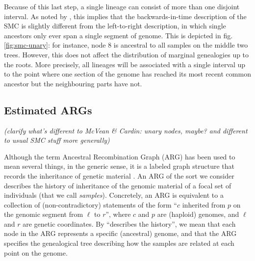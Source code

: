 \documentclass{article}
\newcommand{\comment}[1]{{\it \color{orange} (#1)}}
\begin{document}
Because of this last step, a single lineage can consist of more than one disjoint interval.
As noted by \cite{mcvean_approximating_2005},
this implies that the backwards-in-time description of the
SMC is slightly different from the left-to-right description,
in which single ancestors only ever span a single segment of genome.
This is depicted in fig.\ref{fig:smc-unary}:
for instance, node 8 is ancestral to all samples on the middle two trees.
However, this does not affect the distribution
of marginal genealogies up to the roots.
More precisely, all lineages will be associated with
a single interval up to the point where one section of the
genome has reached its most recent common ancestor but the neighbouring parts have not.

\subsection{Estimated ARGs} \label{par:recording}

\comment{clarify what's different to McVean \& Cardin: unary nodes, maybe? and different to usual SMC stuff more generally}

Although the term Ancestral Recombination Graph (ARG) has been used to mean several things,
in the generic sense, it is a labeled graph structure that records
the inheritance of genetic material \citep{wong_general_2023}.
An ARG of the sort we consider describes the history of inheritance
of the genomic material of a focal set of individuals (that we call \emph{samples}).
Concretely, an ARG is equivalent to a collection of (non-contradictory) statements
of the form ``$c$ inherited from $p$ on the genomic segment from $\ell$ to $r$'',
where $c$ and $p$ are (haploid) genomes, and $\ell$ and $r$ are genetic coordinates.
By ``describes the history'',
we mean that each node in the ARG represents a specific (ancestral) genome,
and that the ARG specifies the genealogical tree describing how the samples are related
at each point on the genome.
\end{document}
